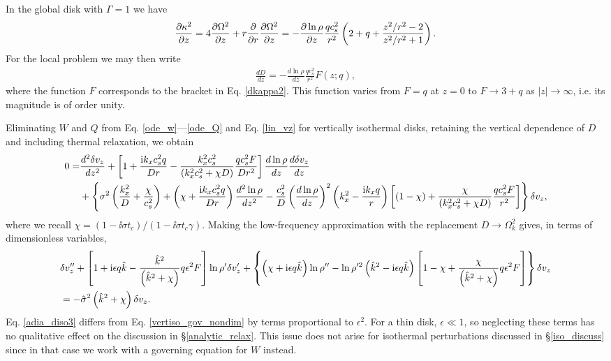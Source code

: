 In the global disk with $\Gamma=1$ we have
\begin{align}\label{dkappa2}
  \frac{\partial\kappa^2}{\partial z} = 4 \frac{\partial\Omega^2}{\partial z} + r\frac{\partial}{\partial
    r}\frac{\partial\Omega^2}{\partial z} = -
  \frac{\partial\ln\rho}{\partial z}\frac{qc_s^2}{r^2} \left(2 + q +
    \frac{z^2/r^2-2}{z^2/r^2+1}\right). 
\end{align}
For the local problem we may then write
\begin{align}
  \frac{dD}{dz}  = - \frac{d\ln\rho}{dz}\frac{qc_s^2}{r^2}F(z;q),
\end{align}
where the function $F$ corresponds to the bracket in
Eq. \ref{dkappa2}. This function varies from $F=q$ at $z=0$ to $F\to
3+q$ as $|z|\to\infty$, i.e. its magnitude is of order unity. 

 Eliminating $W$ and $Q$ from Eq. \ref{ode_w}---\ref{ode_Q} and
 Eq. \ref{lin_vz} for vertically isothermal disks, retaining the
 vertical dependence of $D$ and including thermal relaxation, we
 obtain 
\begin{align}
  0 =& \frac{d^2\delta v_z}{dz^2} + \left[1 + \frac{\mathrm{i} k_x c_s^2
      q}{Dr} - \frac{k_x^2c_s^2}{\left(k_x^2c_s^2 + \chi
        D\right)}\frac{qc_s^2F}{Dr^2}\right]\frac{d\ln\rho}{dz}\frac{d\delta
    v_z}{dz} \notag\\
  &+ \left\{\sigma^2\left(\frac{k_x^2}{D} +
      \frac{\chi}{c_s^2}\right) + \left(\chi + \frac{\mathrm{i} k_x c_s^2
        q}{Dr}\right)\frac{d^2\ln\rho}{dz^2} -
    \frac{c_s^2}{D}\left(\frac{d\ln\rho}{dz}\right)^2\left(k_x^2 -
      \frac{\mathrm{i} k_x q}{r}\right)
   \left[\left(1-\chi\right) +
     \frac{\chi}{\left(k_x^2c_s^2 + \chi D\right)}\frac{qc_s^2 F}{r^2}\right] 
   \right\}\delta v_z,
\end{align}
where we recall $\chi = \left(1-\ii\sigma t_c\right)/\left(1-\ii\sigma
t_c \gamma\right)$. Making the low-frequency approximation with the
replacement $D\to \Omega_k^2$ gives, in terms of dimensionless
variables,
\begin{align}
   &\delta v_z ^{\prime\prime} + \left[1 + \mathrm{i}\epsilon q\hat{k} -
    \frac{ \hat{k}^2}{
      \left(\hat{k}^2+\chi\right)}q \epsilon^2F\right]\ln\rho^{\prime}\delta v_z^\prime +
  \left\{\left(\chi + \mathrm{i} \epsilon q
      \hat{k}\right)\ln\rho^{\prime\prime} - \ln\rho^{\prime
      2}\left(\hat{k}^2 -
      \mathrm{i}\epsilon
      q\hat{k}\right)\left[1 - \chi +
      \frac{\chi}{\left(\hat{k}^2+\chi\right)}q\epsilon^2F\right]\right\}\delta v_z \notag\\&=
  -\hat{\sigma}^2\left(\hat{k}^2+\chi\right)\delta v_z\label{adia_diso3}.
\end{align}   
Eq. \ref{adia_diso3} differs from Eq. \ref{vertiso_gov_nondim} by terms
proportional to $\epsilon^2$. For a thin disk, $\epsilon\ll1$, so
neglecting these terms has no qualitative effect on the discussion in 
\S\ref{analytic_relax}.  This issue does not
arise for isothermal perturbations discussed in \S\ref{iso_discuss}
since in that case we work with a governing equation for $W$ instead. 

